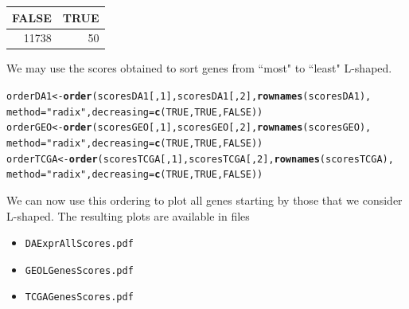 \documentclass[a4paper,10pt]{article}\usepackage[]{graphicx}\usepackage[]{xcolor}
\makeatletter
\newcommand{\hlnum}[1]{\textcolor[rgb]{0.686,0.059,0.569}{#1}}%
\newcommand{\hlstr}[1]{\textcolor[rgb]{0.192,0.494,0.8}{#1}}%
\newcommand{\hlstd}[1]{\textcolor[rgb]{0.345,0.345,0.345}{#1}}%
\newcommand{\hlkwb}[1]{\textcolor[rgb]{0.69,0.353,0.396}{#1}}%
\newcommand{\hlkwc}[1]{\textcolor[rgb]{0.333,0.667,0.333}{#1}}%
\newcommand{\hlkwd}[1]{\textcolor[rgb]{0.737,0.353,0.396}{\textbf{#1}}}%
\newenvironment{kframe}{%
 \def\at@end@of@kframe{}%
 \ifinner\ifhmode%
  \def\at@end@of@kframe{\end{minipage}}%
  \begin{minipage}{\columnwidth}%
 \fi\fi%
 \def\FrameCommand##1{\hskip\@totalleftmargin \hskip-\fboxsep
 \colorbox{shadecolor}{##1}\hskip-\fboxsep
     \hskip-\linewidth \hskip-\@totalleftmargin \hskip\columnwidth}%
 \MakeFramed {\advance\hsize-\width
   \@totalleftmargin\z@ \linewidth\hsize
   \@setminipage}}%
 {\par\unskip\endMakeFramed%
 \at@end@of@kframe}
\newenvironment{knitrout}{}{} %
\makeatother
\begin{document}
\begin{knitrout}
\begin{tabular}{r|r}
\hline
FALSE & TRUE\\
\hline
11738 & 50\\
\hline
\end{tabular}
\end{knitrout}

We may use the scores obtained to sort genes from ``most" to ``least" L-shaped.

\begin{knitrout}
\color{fgcolor}\begin{kframe}
\begin{alltt}
\hlstd{orderDA1}\hlkwb{<-} \hlkwd{order}\hlstd{(scoresDA1[,}\hlnum{1}\hlstd{], scoresDA1[,}\hlnum{2}\hlstd{],} \hlkwd{rownames}\hlstd{(scoresDA1),}
                 \hlkwc{method}\hlstd{=}\hlstr{"radix"}\hlstd{,} \hlkwc{decreasing}\hlstd{=}\hlkwd{c}\hlstd{(}\hlnum{TRUE}\hlstd{,} \hlnum{TRUE}\hlstd{,} \hlnum{FALSE}\hlstd{))}
\hlstd{orderGEO}\hlkwb{<-} \hlkwd{order}\hlstd{(scoresGEO[,}\hlnum{1}\hlstd{], scoresGEO[,}\hlnum{2}\hlstd{],} \hlkwd{rownames}\hlstd{(scoresGEO),}
                 \hlkwc{method}\hlstd{=}\hlstr{"radix"}\hlstd{,} \hlkwc{decreasing}\hlstd{=}\hlkwd{c}\hlstd{(}\hlnum{TRUE}\hlstd{,} \hlnum{TRUE}\hlstd{,} \hlnum{FALSE}\hlstd{))}
\hlstd{orderTCGA}\hlkwb{<-} \hlkwd{order}\hlstd{(scoresTCGA[,}\hlnum{1}\hlstd{], scoresTCGA[,}\hlnum{2}\hlstd{],} \hlkwd{rownames}\hlstd{(scoresTCGA),}
                 \hlkwc{method}\hlstd{=}\hlstr{"radix"}\hlstd{,} \hlkwc{decreasing}\hlstd{=}\hlkwd{c}\hlstd{(}\hlnum{TRUE}\hlstd{,} \hlnum{TRUE}\hlstd{,} \hlnum{FALSE}\hlstd{))}
\end{alltt}
\end{kframe}
\end{knitrout}
We can now use this ordering to plot all genes starting by those that we consider L-shaped. The resulting plots are available in files 
\begin{itemize}
  \item \texttt{DAExprAllScores.pdf}
  \item \texttt{GEOLGenesScores.pdf}
  \item \texttt{TCGAGenesScores.pdf}
\end{itemize}
\end{document}
